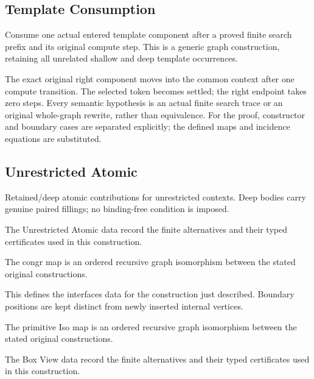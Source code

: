 \subsection{Template Consumption}
Consume one actual entered template component after a proved finite search prefix and its original compute step. This is a generic graph construction, retaining all unrelated shallow and deep template occurrences.

The exact original right component moves into the common context after one compute transition. The selected token becomes settled; the right endpoint takes zero steps. Every semantic hypothesis is an actual finite search trace or an original whole-graph rewrite, rather than equivalence.
For the proof, constructor and boundary cases are separated explicitly; the defined maps and incidence equations are substituted.
\par{}

\subsection{Unrestricted Atomic}
Retained/deep atomic contributions for unrestricted contexts. Deep bodies carry genuine paired fillings; no binding-free condition is imposed.

The Unrestricted Atomic data record the finite alternatives and their typed certificates used in this construction.
\par{}

The congr map is an ordered recursive graph isomorphism between the stated original constructions.
\par{}

This defines the interfaces data for the construction just described. Boundary positions are kept distinct from newly inserted internal vertices.
\par{}

The primitive Iso map is an ordered recursive graph isomorphism between the stated original constructions.
\par{}

The Box View data record the finite alternatives and their typed certificates used in this construction.
\par{}

